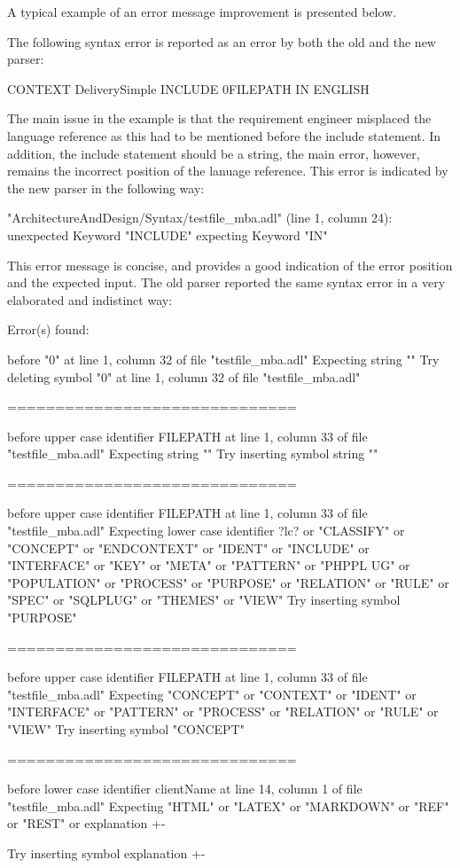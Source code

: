 A typical example of an error message improvement is presented below.

The following syntax error is reported as an error by both the old and the new parser:
\begin{adl}
   CONTEXT DeliverySimple INCLUDE 0FILEPATH IN ENGLISH
\end{adl}

The main issue in the example is that the requirement engineer misplaced the language reference as this had to be mentioned before the include statement.
In addition, the include statement should be a string, the main error, however, remains the incorrect position of the lanuage reference.
This error is indicated by the new parser in the following way:
\begin{error}
   "ArchitectureAndDesign/Syntax/testfile_mba.adl" (line 1, column 24):
   unexpected Keyword "INCLUDE"
   expecting Keyword "IN"
\end{error}

This error message is concise, and provides a good indication of the error position and the expected input.
The old parser reported the same syntax error in a very elaborated and indistinct way:
\begin{error}
   Error(s) found:

   before "0" at line 1, column 32 of file "testfile_mba.adl"
   Expecting string ""
   Try deleting symbol "0" at line 1, column 32 of file "testfile_mba.adl"

   ==============================

   before upper case identifier FILEPATH at line 1, column 33 of file "testfile_mba.adl"
   Expecting string ""
   Try inserting symbol string ""

   ==============================

   before upper case identifier FILEPATH at line 1, column 33 of file "testfile_mba.adl"
   Expecting lower case identifier ?lc? or "CLASSIFY" or "CONCEPT" or "ENDCONTEXT" or "IDENT" or "INCLUDE" or "INTERFACE" or "KEY" or "META" or "PATTERN" or "PHPPL UG" or "POPULATION" or "PROCESS" or "PURPOSE" or "RELATION" or "RULE" or "SPEC" or "SQLPLUG" or "THEMES" or "VIEW"
   Try inserting symbol "PURPOSE"

   ==============================

   before upper case identifier FILEPATH at line 1, column 33 of file "testfile_mba.adl"
   Expecting "CONCEPT" or "CONTEXT" or "IDENT" or "INTERFACE" or "PATTERN" or "PROCESS" or "RELATION" or "RULE" or "VIEW"
   Try inserting symbol "CONCEPT"

   ==============================

   before lower case identifier clientName at line 14, column 1 of file "testfile_mba.adl"
   Expecting "HTML" or "LATEX" or "MARKDOWN" or "REF" or "REST" or explanation {+-}

   Try inserting symbol explanation {+-}
\end{error}

